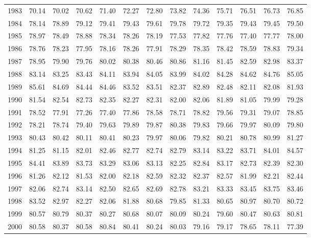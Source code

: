 \begin{longtable}{rrrrrrrrrrrrr}
  1983 & 70.14 & 70.02 & 70.62 & 71.40 & 72.27 & 72.80 & 73.82 & 74.36 & 75.71 & 76.51 & 76.73 & 76.85 \\ 
  1984 & 78.14 & 78.89 & 79.12 & 79.41 & 79.43 & 79.61 & 79.78 & 79.72 & 79.35 & 79.43 & 79.45 & 79.50 \\ 
  1985 & 78.97 & 78.49 & 78.88 & 78.34 & 78.26 & 78.19 & 77.53 & 77.82 & 77.76 & 77.40 & 77.77 & 78.00 \\ 
  1986 & 78.76 & 78.23 & 77.95 & 78.16 & 78.26 & 77.91 & 78.29 & 78.35 & 78.42 & 78.59 & 78.83 & 79.34 \\ 
  1987 & 78.95 & 79.90 & 79.76 & 80.02 & 80.38 & 80.46 & 80.86 & 81.16 & 81.45 & 82.59 & 82.98 & 83.37 \\ 
  1988 & 83.14 & 83.25 & 83.43 & 84.11 & 83.94 & 84.05 & 83.99 & 84.02 & 84.28 & 84.62 & 84.76 & 85.05 \\ 
  1989 & 85.61 & 84.69 & 84.44 & 84.46 & 83.52 & 83.51 & 82.37 & 82.89 & 82.48 & 82.11 & 82.08 & 81.93 \\ 
  1990 & 81.54 & 82.54 & 82.73 & 82.35 & 82.27 & 82.31 & 82.00 & 82.06 & 81.89 & 81.05 & 79.99 & 79.28 \\ 
  1991 & 78.52 & 77.91 & 77.26 & 77.40 & 77.86 & 78.58 & 78.71 & 78.82 & 79.56 & 79.31 & 79.07 & 78.85 \\ 
  1992 & 78.21 & 78.74 & 79.40 & 79.63 & 79.89 & 79.87 & 80.38 & 79.83 & 79.66 & 79.97 & 80.09 & 79.80 \\ 
  1993 & 80.43 & 80.42 & 80.11 & 80.41 & 80.23 & 79.97 & 80.06 & 79.82 & 80.21 & 80.78 & 80.99 & 81.27 \\ 
  1994 & 81.25 & 81.15 & 82.01 & 82.46 & 82.77 & 82.74 & 82.79 & 83.14 & 83.22 & 83.71 & 84.01 & 84.57 \\ 
  1995 & 84.41 & 83.89 & 83.73 & 83.29 & 83.06 & 83.13 & 82.25 & 82.84 & 83.17 & 82.73 & 82.39 & 82.30 \\ 
  1996 & 81.26 & 82.12 & 81.53 & 82.00 & 82.18 & 82.59 & 82.32 & 82.37 & 82.57 & 81.99 & 82.21 & 82.44 \\ 
  1997 & 82.06 & 82.74 & 83.14 & 82.50 & 82.65 & 82.69 & 82.78 & 83.21 & 83.33 & 83.45 & 83.75 & 83.46 \\ 
  1998 & 83.52 & 82.97 & 82.27 & 82.06 & 81.88 & 80.68 & 79.85 & 81.33 & 80.65 & 80.97 & 80.70 & 80.72 \\ 
  1999 & 80.57 & 80.79 & 80.37 & 80.27 & 80.68 & 80.07 & 80.09 & 80.24 & 79.60 & 80.47 & 80.63 & 80.81 \\ 
  2000 & 80.58 & 80.37 & 80.58 & 80.84 & 80.41 & 80.24 & 80.03 & 79.16 & 79.17 & 78.65 & 78.11 & 77.39 \\ 

\end{longtable}
